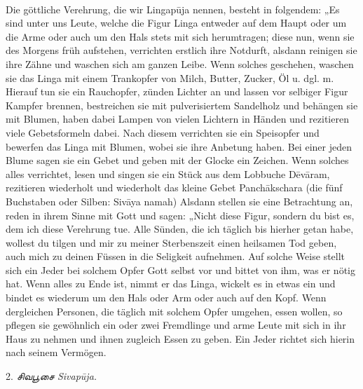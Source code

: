 \documentclass{article}
\newcommand{\TamilText}[1]{\texttamil{#1}}
\newcommand{\tam}[1]{\TamilText{#1}}
\begin{document}
\paragraph{}
Die göttliche Verehrung, die wir Lingap\={u}ja nennen, besteht in folgendem: „Es sind unter uns Leute, welche die Figur Linga entweder auf dem Haupt oder um die Arme oder auch um den Hals stets mit sich herumtragen; diese nun, wenn sie des Morgens früh aufstehen, verrichten erstlich ihre Notdurft, alsdann reinigen sie ihre Zähne und waschen sich am ganzen Leibe. Wenn solches geschehen, waschen sie das Linga mit einem Trankopfer von Milch, Butter, Zucker, Öl u. dgl. m. Hierauf tun sie ein Rauchopfer, zünden Lichter an und lassen vor selbiger Figur Kampfer brennen, bestreichen sie mit pulverisiertem Sandelholz und behängen sie mit Blumen, haben dabei Lampen von vielen Lichtern in Händen und rezitieren viele Gebetsformeln dabei. Nach diesem verrichten sie ein Speisopfer und bewerfen das Linga mit Blumen, wobei sie ihre Anbetung haben. Bei einer jeden Blume sagen sie ein Gebet und geben mit der Glocke ein Zeichen. Wenn solches alles verrichtet, lesen und singen sie ein Stück aus dem Lobbuche D\={e}v\={a}ram, rezitieren wiederholt und wiederholt das kleine Gebet Panch\={a}kschara (die fünf Buchstaben oder Silben: Siv\={a}ya namah) Alsdann stellen sie eine Betrachtung an, reden in ihrem Sinne mit Gott und sagen: „Nicht diese Figur, sondern du bist es, dem ich diese Verehrung tue. Alle Sünden, die ich täglich bis hierher getan habe, wollest du tilgen und mir zu meiner Sterbenszeit einen heilsamen Tod geben, auch mich zu deinen Füssen in die Seligkeit aufnehmen. Auf solche Weise stellt sich ein Jeder bei solchem Opfer Gott selbst vor und bittet von ihm, was er nötig hat. Wenn alles zu Ende ist, nimmt er das Linga, wickelt es in etwas ein und bindet es wiederum um den Hals oder Arm oder auch auf den Kopf. Wenn dergleichen Personen, die täglich mit solchem Opfer umgehen, essen wollen, so pflegen sie gewöhnlich ein oder zwei Fremdlinge und arme Leute mit sich in ihr Haus zu nehmen und ihnen zugleich Essen zu geben. Ein Jeder richtet sich hierin nach seinem Vermögen.

\begin{center}
2. \emph{\tam{சிவபூசை} Sivap\={u}ja.}
\end{center}
\end{document}
